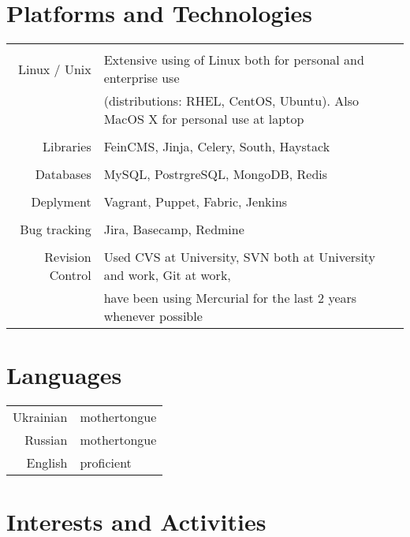 \documentclass[a4paper,10pt]{article}
\begin{document}
\section{Platforms and Technologies}
\begin{tabular}{r|p{11cm}}
\multicolumn{2}{c}{} \\
Linux / Unix & Extensive using of Linux both for personal and enterprise use \\
 & (distributions: RHEL, CentOS, Ubuntu). Also MacOS X for personal use at laptop \\
\multicolumn{2}{c}{} \\
Libraries & FeinCMS, Jinja, Celery, South, Haystack \\
\multicolumn{2}{c}{} \\
Databases & MySQL, PostrgreSQL, MongoDB, Redis \\
\multicolumn{2}{c}{} \\
Deplyment & Vagrant, Puppet, Fabric, Jenkins \\
\multicolumn{2}{c}{} \\
Bug tracking & Jira, Basecamp, Redmine \\
\multicolumn{2}{c}{} \\
Revision Control & Used CVS at University, SVN both at University and work,  Git at work, \\
 & have been using Mercurial for the last 2 years whenever possible \\
\end{tabular}


\section{Languages}
\begin{tabular}{rl}
Ukrainian & mothertongue \\
Russian & mothertongue \\
English & proficient \\
\end{tabular}

\section{Interests and Activities}
\end{document}
